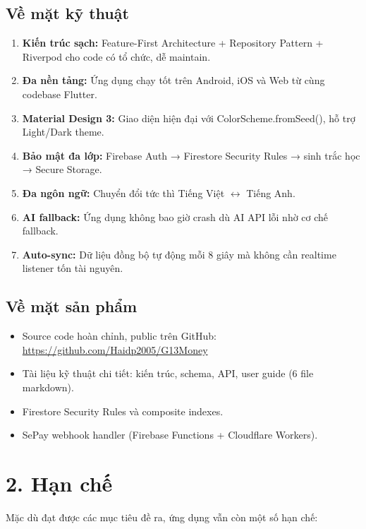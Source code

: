 \subsection*{Về mặt kỹ thuật}

\begin{enumerate}
  \item \textbf{Kiến trúc sạch:} Feature-First Architecture + Repository Pattern + Riverpod cho code có tổ chức, dễ maintain.
  \item \textbf{Đa nền tảng:} Ứng dụng chạy tốt trên Android, iOS và Web từ cùng codebase Flutter.
  \item \textbf{Material Design 3:} Giao diện hiện đại với ColorScheme.fromSeed(), hỗ trợ Light/Dark theme.
  \item \textbf{Bảo mật đa lớp:} Firebase Auth → Firestore Security Rules → sinh trắc học → Secure Storage.
  \item \textbf{Đa ngôn ngữ:} Chuyển đổi tức thì Tiếng Việt $\leftrightarrow$ Tiếng Anh.
  \item \textbf{AI fallback:} Ứng dụng không bao giờ crash dù AI API lỗi nhờ cơ chế fallback.
  \item \textbf{Auto-sync:} Dữ liệu đồng bộ tự động mỗi 8 giây mà không cần realtime listener tốn tài nguyên.
\end{enumerate}

\subsection*{Về mặt sản phẩm}

\begin{itemize}
  \item Source code hoàn chỉnh, public trên GitHub: \url{https://github.com/Haidp2005/G13Money}
  \item Tài liệu kỹ thuật chi tiết: kiến trúc, schema, API, user guide (6 file markdown).
  \item Firestore Security Rules và composite indexes.
  \item SePay webhook handler (Firebase Functions + Cloudflare Workers).
\end{itemize}

\section*{2. Hạn chế}

Mặc dù đạt được các mục tiêu đề ra, ứng dụng vẫn còn một số hạn chế:

